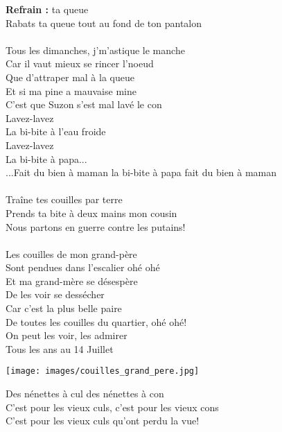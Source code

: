 
\textbf{Refrain :}
 ta queue
\\Rabats ta queue tout au fond de ton pantalon
\\\\Tous les dimanches, j'm'astique le manche
\\Car il vaut mieux se rincer l'noeud
\\Que d'attraper mal à la queue
\\Et si ma pine a mauvaise mine
\\C'est que Suzon s'est mal lavé le con
\\Lavez-lavez ~~~~~~~~~~~~~~~~~~~~~~~~~~~~~~~~\bissimple 
\\La bi-bite à l'eau froide
\\Lavez-lavez  ~~~~~~~~~~~~~~~~~~~~~~~~~~~~~~~~\bissimple 
\\La bi-bite à papa...
\\...Fait du bien à maman la bi-bite à papa fait du bien à maman
\\\\Traîne tes couilles par terre
\\Prends ta bite à deux mains mon cousin
\\Nous partons en guerre contre les putains!
\\\\Les couilles de mon grand-père
\\Sont pendues dans l'escalier ohé ohé
\\Et ma grand-mère se désespère
\\De les voir se dessécher
\\Car c'est la plus belle paire
\\De toutes les couilles du quartier, ohé ohé!
\\On peut les voir, les admirer 
\\Tous les ans au 14 Juillet
\\
\begin{center}
\texttt{[image: images/couilles\_grand\_pere.jpg]}
\end{center}
\breakpage
Des nénettes à cul des nénettes à con
\\C'est pour les vieux culs, c'est pour les vieux cons
\\C'est pour les vieux culs qu'ont perdu la vue!
